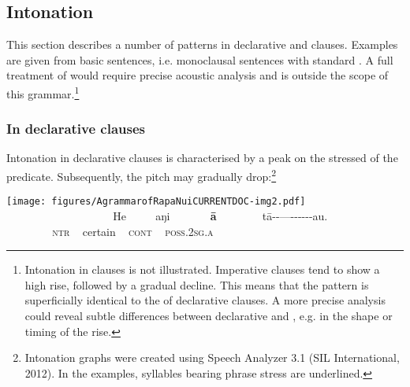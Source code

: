 \subsection{Intonation}\label{sec:2.4.2}
This section describes a number of  patterns in declarative and  clauses. Examples are given from basic sentences, i.e. monoclausal sentences with standard . A full treatment of  would require precise acoustic analysis and is outside the scope of this grammar.\footnote{\label{fn:58}Intonation in  clauses is not illustrated. Imperative clauses tend to show a high rise, followed by a gradual decline. This means that the  pattern is superficially identical to the  of declarative clauses. A more precise analysis could reveal subtle differences between declarative and  , e.g. in the shape or timing of the rise.} 

\subsubsection{In declarative clauses}\label{sec:2.4.2.1}

Intonation in declarative clauses is characterised by a peak on the stressed  of the predicate. Subsequently, the pitch may gradually drop:\footnote{\label{fn:59}Intonation graphs were created using Speech Analyzer 3.1 (SIL International, 2012). In the examples, syllables bearing phrase stress are underlined.}

  

\ea\label{ex:2.6}
\texttt{[image: figures/AgrammarofRapaNuiCURRENTDOC-img2.pdf]}\\
\gll ~ ~ ~ ~ ~~~~~~~~~~~~ He ~~~~ aŋi ~~~~~~ \textbf{{\ꞌ}ā} ~~~~~~~ tā\nobreakdash-\nobreakdash-\nobreakdash---\nobreakdash-\nobreakdash-\nobreakdash-\nobreakdash-\nobreakdash-\nobreakdash-{\ꞌ}au.\\
 ~ ~ ~ ~ ~ \textsc{ntr} ~ certain ~ \textsc{cont} ~ \textsc{poss.2sg.a}\\

